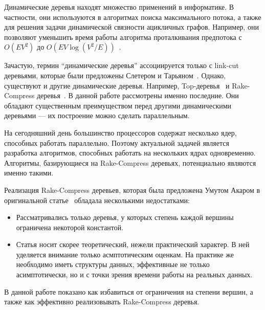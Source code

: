 \startprefacepage

Динамические деревья находят множество применений в информатике. В частности, они используются в 
алгоритмах поиска максимального потока, а также для решения задачи динамической 
связности ацикличных графов. Например, они позволяют уменьшить время работы алгоритма проталкивания
предпотока с $O(EV^2)$ до $O(EV \log (V^2 / E))$~\cite{tarj86}. 

Зачастую, термин ``динамические деревья'' ассоциируется только с link-cut деревьями, которые были предложены 
Слетером и Тарьяном~\cite{tarj83}. Однако, существуют и другие динамические деревья. Например, Top-деревья~\cite{alst05} и Rake-Compress деревья~\cite{acar04, acar05}.
В данной работе рассмотрены именно последние. Они обладают существенным преимуществом перед другими динамическими 
деревьями --- их построение можно сделать параллельным.

На сегодняшний день большинство процессоров содержат несколько ядер, способных работать параллельно. 
Поэтому актуальной задачей является разработка алгоритмов, способных работать на нескольких ядрах одновременно.
Алгоритмы, базирующиеся на Rake-Compress деревьях, потенциально являются именно такими.

Реализация Rake-Compress деревьев, которая была предложена Умутом Акаром в оригинальной статье~\cite{acar04} обладала несколькими недостатками:
\begin{itemize}
\item Рассматривались только деревья, у которых степень каждой вершины ограничена некоторой константой. 
\item Статья носит скорее теоретический, нежели практический характер. В ней уделяется внимание только асмптотическим оценкам. 
На практике же необходимо иметь структуры данных, эффективные не только асимптотически, но и с точки зрения времени работы на реальных данных. 
\end{itemize}

В данной работе показано как избавиться от ограничения на степени вершин, а также как эффективно реализовывать Rake-Compress деревья.

\FloatBarrier
